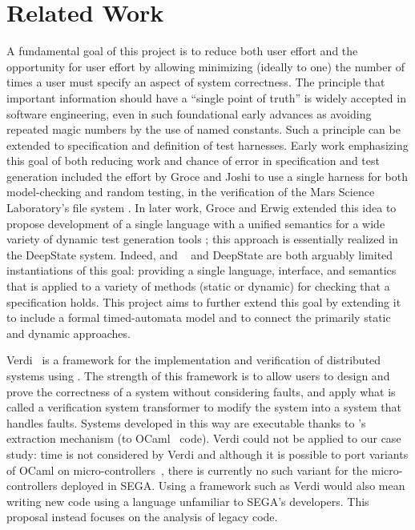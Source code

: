 \section{Related Work}

A fundamental goal of this project is to reduce both user effort and
the opportunity for user effort by allowing minimizing (ideally to
one) the number of times a user must specify an aspect of system
correctness.  The principle that important information should have a
``single point of truth'' is widely accepted in software engineering,
even in such foundational early advances as avoiding repeated magic
numbers by the use of named constants.  Such a principle can be
extended to specification and definition of test harnesses.  Early
work emphasizing this goal of both reducing work and chance of error
in specification and test generation included the effort by Groce and
Joshi to use a single harness for both model-checking and random
testing, in the verification of the Mars Science Laboratory's file
system \cite{WODA08,CFV08,AMAI}.  In later work, Groce and Erwig
extended this idea to propose development of a single language with a
unified semantics for a wide variety of dynamic test generation tools
\cite{WODACommon}; this approach is essentially realized in the
DeepState \cite{DeepState} system.  Indeed, \framac and
\acsl~\cite{ACSL} and DeepState are both arguably limited
instantiations of this goal: providing a single language, interface,
and semantics that is applied to a variety of methods (static or
dynamic) for checking that a specification holds.  This project aims
to further extend this goal by extending it to include a formal
timed-automata model and to connect the primarily static and dynamic approaches.

Verdi~\cite{WWP2015:PLDI,WWA2016:CPP} is a framework for the
implementation and verification of distributed systems using \Coq. The
strength of this framework is to allow users to design and prove the
correctness of a system without considering faults, and apply what is
called a verification system transformer to modify the system into a
system that handles faults.  Systems developed in this way are
executable thanks to \Coq's extraction mechanism (to
OCaml~\cite{MIN2011:CACM} code). Verdi could not be applied to our
case study: time is not considered by Verdi and although it is
possible to port variants of OCaml on
micro-controllers~\cite{VWC2015:PADL}, there is currently no such
variant for the micro-controllers deployed in SEGA. Using a framework
such as Verdi would also mean writing new code using a language
unfamiliar to SEGA's developers. This proposal instead focuses on the
analysis of legacy code.

